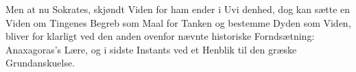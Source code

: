 \documentclass[12pt,a4paper]{book}
\begin{document}
Men at nu Sokrates, skjøndt Viden for ham ender i Uvi\-%
denhed, dog kan sætte en Viden om Tingenes Begreb som
Maal for Tanken og bestemme Dyden som Viden, bliver for\-%
klarligt ved den anden ovenfor nævnte historiske Forndsætning:
Anaxagoras's Lære, og i sidste Instants ved et Henblik til den
græske Grundanskuelse.
\end{document}
